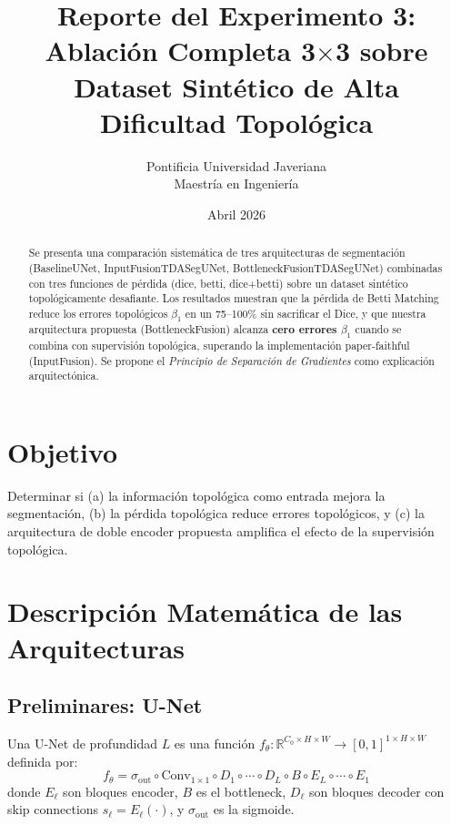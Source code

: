 \documentclass[10pt,twocolumn]{article}
\title{\textbf{Reporte del Experimento 3:}\\Ablación Completa 3$\times$3 sobre Dataset Sintético de Alta Dificultad Topológica}
\author{Pontificia Universidad Javeriana\\Maestría en Ingeniería}
\date{Abril 2026}
\begin{document}
\maketitle

\begin{abstract}
Se presenta una comparación sistemática de tres arquitecturas de segmentación (BaselineUNet, InputFusionTDASegUNet, BottleneckFusionTDASegUNet) combinadas con tres funciones de pérdida (dice, betti, dice+betti) sobre un dataset sintético topológicamente desafiante. Los resultados muestran que la pérdida de Betti Matching reduce los errores topológicos $\beta_1$ en un 75--100\% sin sacrificar el Dice, y que nuestra arquitectura propuesta (BottleneckFusion) alcanza \textbf{cero errores $\beta_1$} cuando se combina con supervisión topológica, superando la implementación paper-faithful (InputFusion). Se propone el \emph{Principio de Separación de Gradientes} como explicación arquitectónica.
\end{abstract}

\section{Objetivo}

Determinar si (a) la información topológica como entrada mejora la segmentación, (b) la pérdida topológica reduce errores topológicos, y (c) la arquitectura de doble encoder propuesta amplifica el efecto de la supervisión topológica.

\section{Descripción Matemática de las Arquitecturas}

\subsection{Preliminares: U-Net}

Una U-Net de profundidad $L$ es una función $f_\theta: \mathbb{R}^{C_0 \times H \times W} \to [0,1]^{1 \times H \times W}$ definida por:
\begin{equation}
f_\theta = \sigma_{\text{out}} \circ \text{Conv}_{1\times1} \circ D_1 \circ \cdots \circ D_L \circ B \circ E_L \circ \cdots \circ E_1
\end{equation}
donde $E_\ell$ son bloques encoder, $B$ es el bottleneck, $D_\ell$ son bloques decoder con skip connections $s_\ell = E_\ell(\cdot)$, y $\sigma_{\text{out}}$ es la sigmoide.
\end{document}
